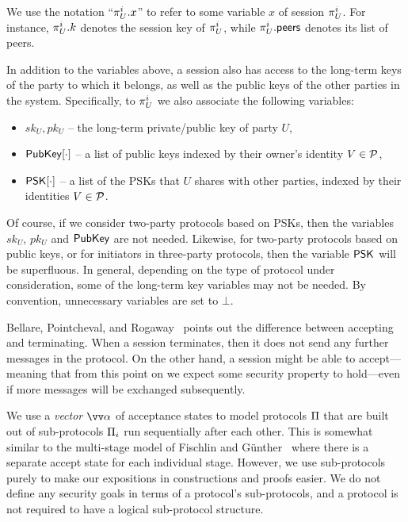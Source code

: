We use the notation ``$\oracle[U][i].x$'' to refer to some variable $x$ of session $\oracle[U][i]$.
For instance,
$\oracle[U][i].\key$ denotes the session key of $\oracle[U][i]$,
while $\oracle[U][i].\peers$ denotes its list of peers.

In addition to the variables above,
a session also has access to the long-term keys of the party to which it belongs,
as well as the public keys of the other parties in the system.
Specifically, to $\oracle[U][i]$ we also associate the following variables:
\begin{itemize}
	
	\item $sk_U,pk_U$ -- the long-term private/public key of party $U$, 
		
	\item $\mathsf{PubKey}[\cdot]$ -- a list of public keys indexed by their owner's identity $V \in \mathcal{P}$,


	\item $\mathsf{PSK}[\cdot]$ -- a list of the PSKs that $U$ shares with other parties,
	indexed by their identities $V \in \mathcal{P}$.
	
\end{itemize}

Of course,
if we consider two-party  protocols based on PSKs,
then the variables $sk_U$, $pk_U$ and $\mathsf{PubKey}$ are not needed.
Likewise,
for two-party protocols based on public keys,
or for initiators in three-party protocols,
then the variable $\mathsf{PSK}$ will be superfluous.
In general,
depending on the type of protocol under consideration,
some of the long-term key variables may not be needed.
By convention,
unnecessary variables are set to $\bot$. 


\begin{remark}
Bellare, Pointcheval, and Rogaway~\cite[Remark~2]{EC:BelPoiRog00} points out the difference between accepting and terminating.
When a session terminates,
then it does not send any further messages in the protocol. 
On the other hand,
a session might be able to accept---meaning 
that from this point on we expect some security property to hold---even 
if more messages will be exchanged subsequently.
\end{remark}

We use a \emph{vector} $\vrunstate$ of acceptance states to model protocols $\mathrm{\Pi}$ that are built out of sub-protocols $\mathrm{\Pi}_i$ run sequentially after each other.
This is somewhat similar to the multi-stage model of Fischlin and Günther~\cite{CCS:FisGue14} where there is a separate accept state for each individual stage.
However,
we use sub-protocols purely to make our expositions in constructions and proofs easier.
We do not define any security goals in terms of a protocol's sub-protocols,
and a protocol is not required to have a logical sub-protocol structure.


